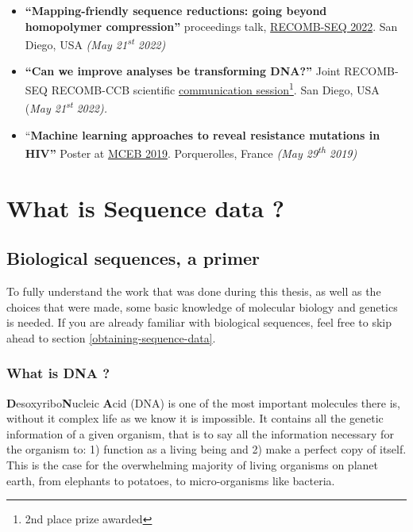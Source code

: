 \documentclass[
  11pt,
  twoside]{scrbook}
\begin{document}
\begin{itemize}
\item
  \textbf{``Mapping-friendly sequence reductions: going beyond homopolymer compression''} proceedings talk, \href{https://recomb2022.net/recomb-seq/}{RECOMB-SEQ 2022}. San Diego, USA \emph{(May 21\textsuperscript{st} 2022)}
\item
  \textbf{``Can we improve analyses be transforming DNA?''} Joint RECOMB-SEQ RECOMB-CCB scientific \href{https://recomb2022.net/recomb-ccb-seq-scientific-communication/}{communication session}\footnote{2nd place prize awarded}. San Diego, USA (\emph{May 21\textsuperscript{st}} \emph{2022).}
\item
  ``\textbf{Machine learning approaches to reveal resistance mutations in HIV''} Poster at \href{https://www.lirmm.fr/mceb2019/}{MCEB 2019}. Porquerolles, France \emph{(May 29\textsuperscript{th} 2019)}
\end{itemize}

\hypertarget{what-is-sequence-data}{%
\chapter{What is Sequence data ?}\label{what-is-sequence-data}}

\hypertarget{biological-sequences-a-primer}{%
\section{Biological sequences, a primer}\label{biological-sequences-a-primer}}

To fully understand the work that was done during this thesis, as well as the choices that were made, some basic knowledge of molecular biology and genetics is needed. If you are already familiar with biological sequences, feel free to skip ahead to section \ref{obtaining-sequence-data}.

\hypertarget{what-is-dna}{%
\subsection{What is DNA ?}\label{what-is-dna}}

\textbf{D}esoxyribo\textbf{N}ucleic \textbf{A}cid (DNA) is one of the most important molecules there is, without it complex life as we know it is impossible. It contains all the genetic information of a given organism, that is to say all the information necessary for the organism to: 1) function as a living being and 2) make a perfect copy of itself. This is the case for the overwhelming majority of living organisms on planet earth, from elephants to potatoes, to micro-organisms like bacteria.
\end{document}
